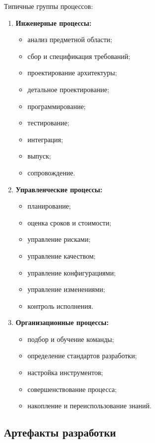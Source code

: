 \documentclass[12pt,a4paper]{article}
\begin{document}
Типичные группы процессов:
\begin{enumerate}
    \item \textbf{Инженерные процессы:}
    \begin{itemize}
        \item анализ предметной области;
        \item сбор и спецификация требований;
        \item проектирование архитектуры;
        \item детальное проектирование;
        \item программирование;
        \item тестирование;
        \item интеграция;
        \item выпуск;
        \item сопровождение.
    \end{itemize}

    \item \textbf{Управленческие процессы:}
    \begin{itemize}
        \item планирование;
        \item оценка сроков и стоимости;
        \item управление рисками;
        \item управление качеством;
        \item управление конфигурациями;
        \item управление изменениями;
        \item контроль исполнения.
    \end{itemize}

    \item \textbf{Организационные процессы:}
    \begin{itemize}
        \item подбор и обучение команды;
        \item определение стандартов разработки;
        \item настройка инструментов;
        \item совершенствование процесса;
        \item накопление и переиспользование знаний.
    \end{itemize}
\end{enumerate}

\subsection{Артефакты разработки}
\end{document}

